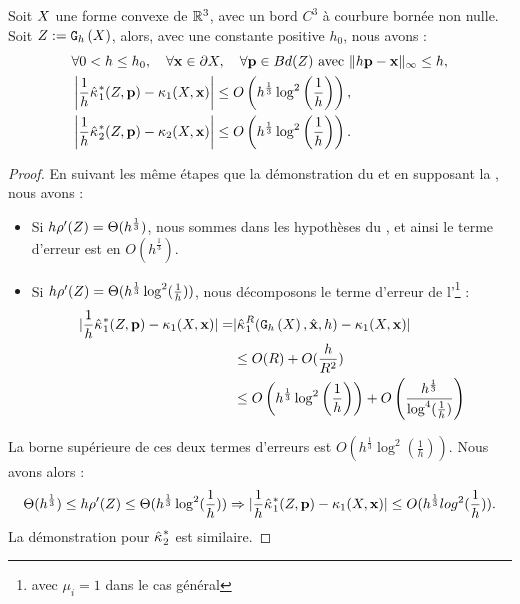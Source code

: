 \begin{observation}{}
  \label{obs:curvature-estimator-3d-k1k2-pf-conv}
  Soit $X$ une forme convexe de $\mathbb{R}^3$, avec un bord $C^3$ à
  courbure bornée non nulle. Soit $Z := \mathtt{G}_{h}\left(X\right)$, alors, avec une
  constante positive $h_0$, nous avons :
  \begin{align}
    &\forall 0 < h \le h_0, \quad \forall \mathbf{x} \in \partial X, \quad \forall \mathbf{p} \in Bd({Z}) \text{~avec~} \| h\mathbf{p} -\mathbf{x}\|_\infty \le h, \nonumber\\
    &\left | \frac{1}{h}\hat{\kappa_{}}_{1}^{*}(Z,\mathbf{p}) - \kappa_{1}(X,\mathbf{x}) \right| \le O\left( h^{\frac{1}{3}} \log^2 \left(\frac{1}{h}\right)\right) ,\\
    &\left | \frac{1}{h}\hat{\kappa_{}}_{2}^{*}(Z,\mathbf{p}) - \kappa_{2}(X,\mathbf{x}) \right| \le O\left( h^{\frac{1}{3}} \log^2 \left(\frac{1}{h}\right)\right) .
  \end{align}
\end{observation}
\begin{proof}
  En suivant les même étapes que la démonstration du
   et en supposant la
  , nous avons :
  \begin{itemize}
    \item Si $h\rho'(Z) = \Theta(h^{\frac{1}{3}})$, nous sommes dans les hypothèses du , et ainsi le terme d'erreur est en $O(h^\frac{1}{3})$.
    \item Si $h\rho'(Z) = \Theta(h^{\frac{1}{3}} \log^2 (\frac{1}{h}))$,
    nous décomposons le terme d'erreur de
    l'\footnote{avec $\mu_i = 1$
    dans le cas général} :
    \begin{align}
      |\frac{1}{h}\hat{\kappa_{}}_{1}^{*}(Z, \mathbf{p}) - \kappa_{1}(X, \mathbf{x}) | =  &| \hat{\kappa_{}}_{1}^{R}(\mathtt{G}_{h}\left(X\right),\hat{\mathbf{x}},h) - \kappa_{1}(X,\mathbf{x}) |  \nonumber \\
      & \le O(R) + O( \frac{h}{R^2}) \\
      & \le O\left(h^{\frac{1}{3}} \log^2 \left(\frac{1}{h}\right)\right) + O\left( \frac{h^{\frac{1}{3}}}{\log^4 (\frac{1}{h})} \right)
    \end{align}
  \end{itemize}
  La borne supérieure de ces deux termes d'erreurs est $O\left(h^{\frac{1}{3}}
  \log^2 \left(\frac{1}{h}\right)\right)$. Nous avons alors :
  \begin{equation}
    \Theta(h^{\frac{1}{3}}) \le h{\rho'(Z)} \le \Theta(h^{\frac{1}{3}} \log^2 (\frac{1}{h})) \Rightarrow | \frac{1}{h}\hat{\kappa_{}}_{1}^{*}(Z, \mathbf{p}) - \kappa_{1}(X, \mathbf{x}) | \le O(h^{\frac{1}{3}} log^2({\frac{1}{h}})).
  \end{equation}
  La démonstration pour $\hat{\kappa_{}}_{2}^{*}$ est similaire.
\end{proof}

